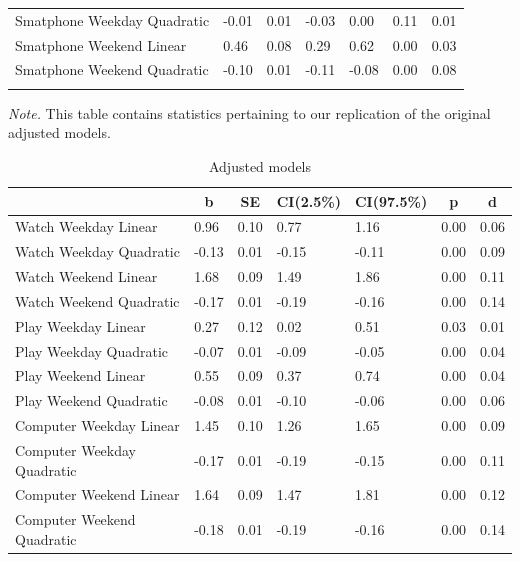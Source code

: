 \documentclass[man]{apa6}
\theoremstyle{definition}
\theoremstyle{definition}
\theoremstyle{definition}
\theoremstyle{remark}
\begin{document}
\begin{table}[tbp]
\begin{center}
\begin{threeparttable}
\begin{tabular}{lllllll}
Smatphone Weekday Quadratic & -0.01 & 0.01 & -0.03 & 0.00 & 0.11 & 0.01\\
Smatphone Weekend Linear & 0.46 & 0.08 & 0.29 & 0.62 & 0.00 & 0.03\\
Smatphone Weekend Quadratic & -0.10 & 0.01 & -0.11 & -0.08 & 0.00 & 0.08\\
\bottomrule
\addlinespace
\end{tabular}
\begin{tablenotes}[para]
\textit{Note.} This table contains statistics pertaining to our replication of the original adjusted models.
\end{tablenotes}
\end{threeparttable}
\end{center}
\end{table}

\begin{table}[tbp]
\begin{center}
\begin{threeparttable}
\caption{\label{tab:unnamed-chunk-1}Adjusted models}
\begin{tabular}{lllllll}
\toprule
 & \multicolumn{1}{c}{b} & \multicolumn{1}{c}{SE} & \multicolumn{1}{c}{CI(2.5\%)} & \multicolumn{1}{c}{CI(97.5\%)} & \multicolumn{1}{c}{p} & \multicolumn{1}{c}{d}\\
\midrule
Watch Weekday Linear & 0.96 & 0.10 & 0.77 & 1.16 & 0.00 & 0.06\\
Watch Weekday Quadratic & -0.13 & 0.01 & -0.15 & -0.11 & 0.00 & 0.09\\
Watch Weekend Linear & 1.68 & 0.09 & 1.49 & 1.86 & 0.00 & 0.11\\
Watch Weekend Quadratic & -0.17 & 0.01 & -0.19 & -0.16 & 0.00 & 0.14\\
Play Weekday Linear & 0.27 & 0.12 & 0.02 & 0.51 & 0.03 & 0.01\\
Play Weekday Quadratic & -0.07 & 0.01 & -0.09 & -0.05 & 0.00 & 0.04\\
Play Weekend Linear & 0.55 & 0.09 & 0.37 & 0.74 & 0.00 & 0.04\\
Play Weekend Quadratic & -0.08 & 0.01 & -0.10 & -0.06 & 0.00 & 0.06\\
Computer Weekday Linear & 1.45 & 0.10 & 1.26 & 1.65 & 0.00 & 0.09\\
Computer Weekday Quadratic & -0.17 & 0.01 & -0.19 & -0.15 & 0.00 & 0.11\\
Computer Weekend Linear & 1.64 & 0.09 & 1.47 & 1.81 & 0.00 & 0.12\\
Computer Weekend Quadratic & -0.18 & 0.01 & -0.19 & -0.16 & 0.00 & 0.14\\

\end{tabular}
\end{threeparttable}
\end{center}
\end{table}
\end{document}
